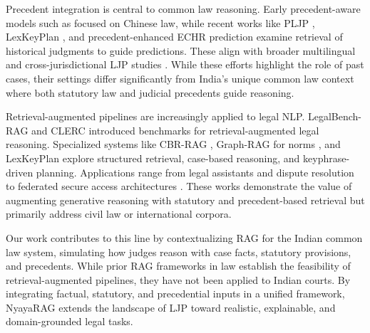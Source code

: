 Precedent integration is central to common law reasoning. Early precedent-aware models such as \citep{zhao-etal-2018-learning} focused on Chinese law, while recent works like PLJP \citep{wu2023precedent}, LexKeyPlan \citep{santosh2025lexkeyplan}, and precedent-enhanced ECHR prediction \citep{santosh2024incorporating} examine retrieval of historical judgments to guide predictions. These align with broader multilingual and cross-jurisdictional LJP studies \citep{niklaus2021swiss, kapoor-etal-2022-hldc}. While these efforts highlight the role of past cases, their settings differ significantly from India’s unique common law context where both statutory law and judicial precedents guide reasoning.

Retrieval-augmented pipelines are increasingly applied to legal NLP. LegalBench-RAG \citep{pipitone2024legalbench} and CLERC \citep{hou2024clerc} introduced benchmarks for retrieval-augmented legal reasoning. Specialized systems like CBR-RAG \citep{wiratunga2024cbr}, Graph-RAG for norms \citep{de2025graph}, and LexKeyPlan \citep{santosh2025lexkeyplan} explore structured retrieval, case-based reasoning, and keyphrase-driven planning. Applications range from legal assistants and dispute resolution \citep{rafat2024ai,10887211} to federated secure access architectures \citep{amato2024optimizing}. These works demonstrate the value of augmenting generative reasoning with statutory and precedent-based retrieval but primarily address civil law or international corpora.

Our work contributes to this line by contextualizing RAG for the Indian common law system, simulating how judges reason with case facts, statutory provisions, and precedents. While prior RAG frameworks in law \citep{wiratunga2024cbr, hou2024clerc, wu2023precedent, santosh2024incorporating} establish the feasibility of retrieval-augmented pipelines, they have not been applied to Indian courts. By integrating factual, statutory, and precedential inputs in a unified framework, NyayaRAG extends the landscape of LJP toward realistic, explainable, and domain-grounded legal tasks.